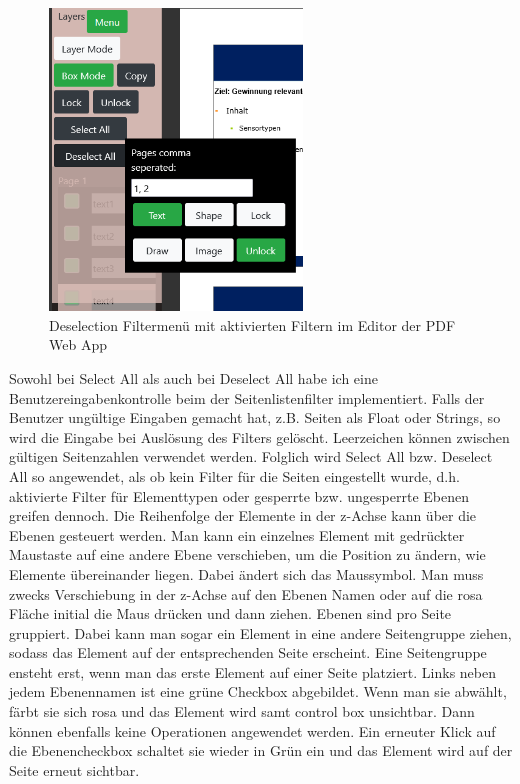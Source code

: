 \begin{figure}[!htbp]
	\centering
	\includegraphics[width=0.6\textwidth]{"images/filtering.png"}
	\caption{Deselection Filtermenü mit aktivierten Filtern im Editor der PDF Web App}
	\label{fig:filtering}
\end{figure}

Sowohl bei Select All als auch bei Deselect All habe ich eine Benutzereingabenkontrolle beim der Seitenlistenfilter implementiert. Falls der Benutzer ungültige Eingaben gemacht hat, z.B. Seiten als Float oder Strings, so wird die Eingabe bei Auslösung des Filters gelöscht. Leerzeichen können zwischen gültigen Seitenzahlen verwendet werden. Folglich wird Select All bzw. Deselect All so angewendet, als ob kein Filter für die Seiten eingestellt wurde, d.h. aktivierte Filter für Elementtypen oder gesperrte bzw. ungesperrte Ebenen greifen dennoch. Die Reihenfolge der Elemente in der z-Achse kann über die Ebenen gesteuert werden. Man kann ein einzelnes Element mit gedrückter Maustaste auf eine andere Ebene verschieben, um die Position zu ändern, wie Elemente übereinander liegen. Dabei ändert sich das Maussymbol. Man muss zwecks Verschiebung in der z-Achse auf den Ebenen Namen oder auf die rosa Fläche initial die Maus drücken und dann ziehen. Ebenen sind pro Seite gruppiert. Dabei kann man sogar ein Element in eine andere Seitengruppe ziehen, sodass das Element auf der entsprechenden Seite erscheint. Eine Seitengruppe ensteht erst, wenn man das erste Element auf einer Seite platziert. Links neben jedem Ebenennamen ist eine grüne Checkbox abgebildet. Wenn man sie abwählt, färbt sie sich rosa und das Element wird samt control box unsichtbar. Dann können ebenfalls keine Operationen angewendet werden. Ein erneuter Klick auf die Ebenencheckbox schaltet sie wieder in Grün ein und das Element wird auf der Seite erneut sichtbar. 

